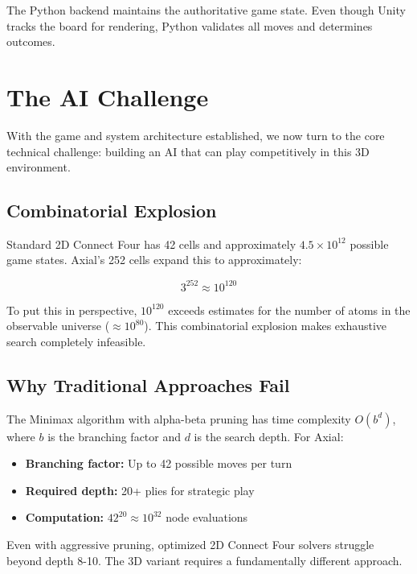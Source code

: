 \documentclass[11pt]{article}
\begin{document}
The Python backend maintains the authoritative game state. Even though Unity tracks the board for rendering, Python validates all moves and determines outcomes.

\section{The AI Challenge}

With the game and system architecture established, we now turn to the core technical challenge: building an AI that can play competitively in this 3D environment.

\subsection{Combinatorial Explosion}

Standard 2D Connect Four has 42 cells and approximately $4.5 \times 10^{12}$ possible game states. Axial's 252 cells expand this to approximately:

\begin{equation}
    3^{252} \approx 10^{120}
\end{equation}

To put this in perspective, $10^{120}$ exceeds estimates for the number of atoms in the observable universe ($\approx 10^{80}$). This combinatorial explosion makes exhaustive search completely infeasible.

\subsection{Why Traditional Approaches Fail}

The Minimax algorithm with alpha-beta pruning has time complexity $O(b^d)$, where $b$ is the branching factor and $d$ is the search depth. For Axial:

\begin{itemize}
    \item \textbf{Branching factor:} Up to 42 possible moves per turn
    \item \textbf{Required depth:} 20+ plies for strategic play
    \item \textbf{Computation:} $42^{20} \approx 10^{32}$ node evaluations
\end{itemize}

Even with aggressive pruning, optimized 2D Connect Four solvers struggle beyond depth 8-10. The 3D variant requires a fundamentally different approach.
\end{document}
